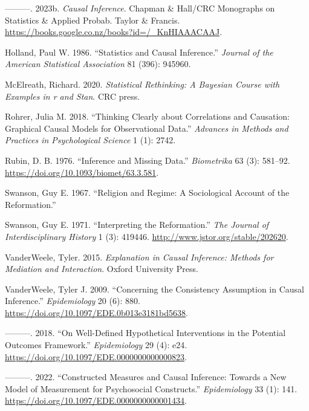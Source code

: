 \documentclass[
  singlecolumn]{report}
\newlength{\cslhangindent}
\newlength{\cslentryspacingunit} %
\newenvironment{CSLReferences}[2] %
 {%
  \setlength{\parindent}{0pt}
  \ifodd #1
  \let\oldpar\par
  \def\par{\hangindent=\cslhangindent\oldpar}
  \fi
  \setlength{\parskip}{#2\cslentryspacingunit}
 }%
 {}
\begin{document}
\begin{CSLReferences}{1}{0}
\leavevmode{}%
---------. 2023b. \emph{Causal Inference}. Chapman \& Hall/CRC
Monographs on Statistics \& Applied Probab. Taylor \& Francis.
\url{https://books.google.co.nz/books?id=/_KnHIAAACAAJ}.

\leavevmode{}%
Holland, Paul W. 1986. {``Statistics and Causal Inference.''}
\emph{Journal of the American Statistical Association} 81 (396): 945960.

\leavevmode{}%
McElreath, Richard. 2020. \emph{Statistical Rethinking: A Bayesian
Course with Examples in r and Stan}. CRC press.

\leavevmode{}%
Rohrer, Julia M. 2018. {``Thinking Clearly about Correlations and
Causation: Graphical Causal Models for Observational Data.''}
\emph{Advances in Methods and Practices in Psychological Science} 1 (1):
2742.

\leavevmode{}%
Rubin, D. B. 1976. {``Inference and Missing Data.''} \emph{Biometrika}
63 (3): 581--92. \url{https://doi.org/10.1093/biomet/63.3.581}.

\leavevmode{}%
Swanson, Guy E. 1967. {``Religion and Regime: A Sociological Account of
the Reformation.''}

\leavevmode{}%
Swanson, Guy E. 1971. {``Interpreting the Reformation.''} \emph{The
Journal of Interdisciplinary History} 1 (3): 419446.
\url{http://www.jstor.org/stable/202620}.

\leavevmode{}%
VanderWeele, Tyler. 2015. \emph{Explanation in Causal Inference: Methods
for Mediation and Interaction}. Oxford University Press.

\leavevmode{}%
VanderWeele, Tyler J. 2009. {``Concerning the Consistency Assumption in
Causal Inference.''} \emph{Epidemiology} 20 (6): 880.
\url{https://doi.org/10.1097/EDE.0b013e3181bd5638}.

\leavevmode{}%
---------. 2018. {``On Well-Defined Hypothetical Interventions in the
Potential Outcomes Framework.''} \emph{Epidemiology} 29 (4): e24.
\url{https://doi.org/10.1097/EDE.0000000000000823}.

\leavevmode{}%
---------. 2022. {``Constructed Measures and Causal Inference: Towards a
New Model of Measurement for Psychosocial Constructs.''}
\emph{Epidemiology} 33 (1): 141.
\url{https://doi.org/10.1097/EDE.0000000000001434}.


\end{CSLReferences}
\end{document}
